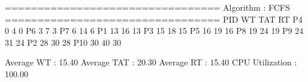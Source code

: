 
=================================
Algorithm : FCFS
=================================
PID	WT	TAT	RT
P4	0	4	0
P6	3	7	3
P7	6	14	6
P1	13	16	13
P3	15	18	15
P5	16	19	16
P8	19	24	19
P9	24	31	24
P2	28	30	28
P10	30	40	30

Average WT : 15.40
Average TAT : 20.30
Average RT : 15.40
CPU Utilization : 100.00%
